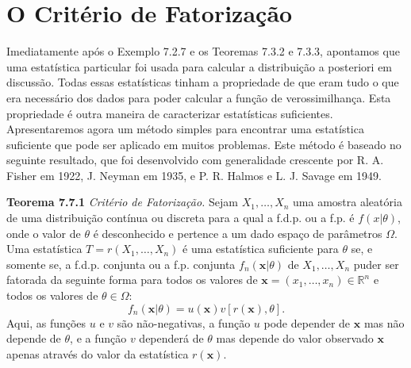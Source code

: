 \section*{O Critério de Fatorização}

Imediatamente após o Exemplo 7.2.7 e os Teoremas 7.3.2 e 7.3.3, apontamos que uma estatística particular foi usada para calcular a distribuição a posteriori em discussão. Todas essas estatísticas tinham a propriedade de que eram tudo o que era necessário dos dados para poder calcular a função de verossimilhança. Esta propriedade é outra maneira de caracterizar estatísticas suficientes. Apresentaremos agora um método simples para encontrar uma estatística suficiente que pode ser aplicado em muitos problemas. Este método é baseado no seguinte resultado, que foi desenvolvido com generalidade crescente por R. A. Fisher em 1922, J. Neyman em 1935, e P. R. Halmos e L. J. Savage em 1949.

\noindent\textbf{Teorema 7.7.1} \quad \textit{Critério de Fatorização.} Sejam $X_1, \dots, X_n$ uma amostra aleatória de uma distribuição contínua ou discreta para a qual a f.d.p. ou a f.p. é $f(x|\theta)$, onde o valor de $\theta$ é desconhecido e pertence a um dado espaço de parâmetros $\Omega$. Uma estatística $T = r(X_1, \dots, X_n)$ é uma estatística suficiente para $\theta$ se, e somente se, a f.d.p. conjunta ou a f.p. conjunta $f_n(\mathbf{x}|\theta)$ de $X_1, \dots, X_n$ puder ser fatorada da seguinte forma para todos os valores de $\mathbf{x}=(x_1, \dots, x_n) \in \mathbb{R}^n$ e todos os valores de $\theta \in \Omega$:
\begin{equation}
f_n(\mathbf{x}|\theta) = u(\mathbf{x})v[r(\mathbf{x}), \theta]. \tag{7.7.1}
\end{equation}
Aqui, as funções $u$ e $v$ são não-negativas, a função $u$ pode depender de $\mathbf{x}$ mas não depende de $\theta$, e a função $v$ dependerá de $\theta$ mas depende do valor observado $\mathbf{x}$ apenas através do valor da estatística $r(\mathbf{x})$.

\vspace{\baselineskip}

